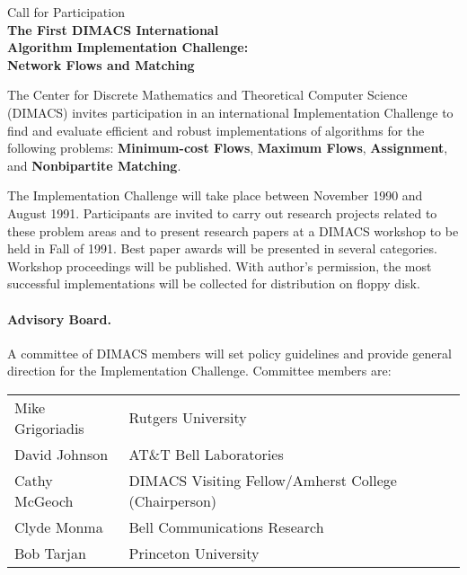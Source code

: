 \setlength{\topmargin}{-.8in}
\addtolength{\textheight}{1.8in}
\addtolength{\textwidth}{\evensidemargin}
\addtolength{\textwidth}{\oddsidemargin}
\setlength{\oddsidemargin}{.25in}
\setlength{\evensidemargin}{.25in}
\addtolength{\textwidth}{-1.0\oddsidemargin}
\addtolength{\textwidth}{-1.0\evensidemargin}

\setlength{\baselineskip}{14pt}

\begin{center}
{\Large  Call for Participation}\\ 
{\LARGE \bf The First DIMACS International \\
Algorithm Implementation Challenge: \\
Network Flows and Matching }
\end{center} 
\vspace{.25in}

The Center for Discrete Mathematics and Theoretical Computer Science
(DIMACS) invites participation in an international Implementation Challenge 
to find and evaluate efficient and robust implementations of algorithms
for the following problems: {\bf Minimum-cost Flows}, {\bf Maximum Flows}, 
{\bf Assignment}, and {\bf Nonbipartite Matching}. 

The Implementation Challenge will take place between November 1990 and
August 1991.  Participants are invited to carry out research 
projects  related to these problem areas and to present research papers 
at a DIMACS workshop to be held in Fall of 1991.  Best paper awards
will be presented in several categories.  Workshop proceedings will 
be published. With author's permission, the most successful implementations
will be collected for distribution on floppy disk. 

\paragraph{Advisory Board.}  
A committee of DIMACS members will set policy guidelines and 
provide general direction for the Implementation Challenge. 
 Committee members are:  
\vspace{.1in} 

\begin{tabular}{ll}
Mike Grigoriadis & Rutgers University \\
David Johnson & AT\&T Bell Laboratories \\
Cathy McGeoch & DIMACS Visiting Fellow/Amherst College (Chairperson)\\
Clyde Monma & Bell Communications Research \\
Bob Tarjan & Princeton University \\
\end{tabular}

